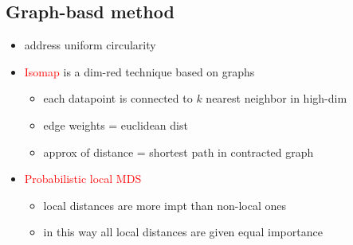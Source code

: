 \documentclass[font=12pt]{article}
\begin{document}
\subsection{Graph-basd method}
		\begin{itemize}
			\item address uniform circularity
			\item  \textcolor{red}{Isomap} is a dim-red technique based on graphs
				\begin{itemize}
					
			\item each datapoint is connected to $k$ nearest neighbor in high-dim
			\item edge weights = euclidean dist
			\item approx of distance = shortest path in contracted graph
			\end{itemize}
		\item \textcolor{red}{Probabilistic local MDS}
			\begin{itemize}
				\item local distances are more impt than non-local ones
				\item in this way all local distances are given equal importance	\end{itemize}


\end{itemize}
\end{document}
